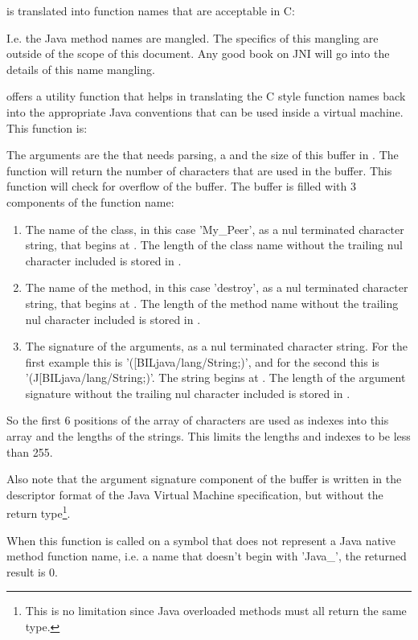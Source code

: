 is translated into function names that are acceptable in C:



I.e. the Java method names are mangled.
The specifics of this mangling are outside of the scope of this
document. Any good book on JNI will go into the details of this name
mangling.

\oswald offers a utility function  that helps in
translating the C style function names back into the appropriate Java
conventions that can be used inside a virtual machine. This function is:


The arguments are the  that needs parsing, a  and the size of
this buffer in . The function will return the number of
characters that are used in the buffer. This function will check for
overflow of the buffer. The buffer is filled with 3 components of the
function name:

\begin{enumerate}
\item The name of the class, in this case 'My\_Peer', as a nul terminated
character string, that begins at . The length of
the class name without the trailing nul character included is stored in
.
\item The name of the method, in this case 'destroy', as a nul terminated
character string, that begins at . The length of
the method name without the trailing nul character included is stored in
.
\item The signature of the arguments, as a nul terminated character string.
For the first example this is '([BILjava/lang/String;)',
and for the second this is '(J[BILjava/lang/String;)'. The string begins at . The length of
the argument signature without the trailing nul character included is stored in
.
\end{enumerate}

So the first 6 positions of the  array of characters are used
as indexes into this array and the lengths of the strings. This limits the
lengths and indexes to be less than 255.

Also note that the argument signature component of the buffer is written in the
descriptor format of the Java Virtual Machine specification, but without the
return type\footnote{This is no limitation since Java overloaded methods
must all return the same type.}.

When this function is called on a symbol that does not represent a Java
native method function name, i.e. a name that doesn't begin with
'Java\_', the returned result is 0.

%
%



